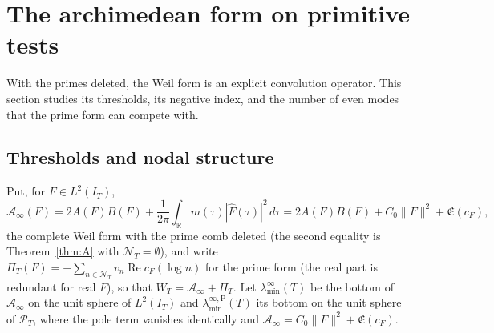 \documentclass[11pt]{amsart}
\theoremstyle{definition}
\theoremstyle{remark}
\newcommand{\R}{\mathbb R}
\newcommand{\Rel}{\operatorname{Re}}
\newcommand{\PT}{\mathcal P_T}
\newcommand{\IT}{I_T}
\newcommand{\Fh}{\widehat F}
\newcommand{\cF}{c_F}
\newcommand{\Lev}{\mathfrak E}
\newcommand{\NT}{\mathcal N_T}
\newcommand{\Ainf}{\mathcal A_\infty}
\newcommand{\PiT}{\Pi_T}
\newcommand{\laminf}{\lambda^{\infty}_{\min}}
\newcommand{\laminfP}{\lambda^{\infty,\mathrm P}_{\min}}
\begin{document}
\section{The archimedean form on primitive tests}\label{sec:archstr}

With the primes deleted, the Weil form is an explicit convolution operator. This section studies
its thresholds, its negative index, and the number of even modes that the prime form can compete
with.

\subsection{Thresholds and nodal structure}\label{subsec:arch}

Put, for $F\in L^2(\IT)$,
\[
\Ainf(F)=2A(F)B(F)+\frac1{2\pi}\int_\R m(\tau)|\Fh(\tau)|^2\,d\tau
=2A(F)B(F)+C_0\|F\|^2+\Lev(\cF),
\]
the complete Weil form with the prime comb deleted (the second equality is Theorem~\ref{thm:A} with
$\NT=\emptyset$), and write $\PiT(F)=-\sum_{n\in\NT}v_n\Rel\cF(\log n)$ for the prime form (the real part is redundant for real $F$), so that
$W_T=\Ainf+\PiT$. Let $\laminf(T)$ be the bottom of $\Ainf$ on the unit sphere of $L^2(\IT)$ and
$\laminfP(T)$ its bottom on the unit sphere of $\PT$, where the pole term vanishes identically and
$\Ainf=C_0\|F\|^2+\Lev(\cF)$.
\end{document}
